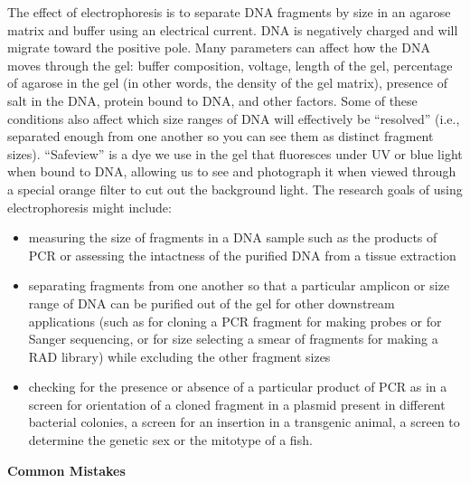 \documentclass[
  letterpaper,
  DIV=11,
  numbers=noendperiod]{scrreprt}
\begin{document}
The effect of electrophoresis is to separate DNA fragments by size in an
agarose matrix and buffer using an electrical current. DNA is negatively
charged and will migrate toward the positive pole. Many parameters can
affect how the DNA moves through the gel: buffer composition, voltage,
length of the gel, percentage of agarose in the gel (in other words, the
density of the gel matrix), presence of salt in the DNA, protein bound
to DNA, and other factors. Some of these conditions also affect which
size ranges of DNA will effectively be ``resolved'' (i.e., separated
enough from one another so you can see them as distinct fragment sizes).
``Safeview'' is a dye we use in the gel that fluoresces under UV or blue
light when bound to DNA, allowing us to see and photograph it when
viewed through a special orange filter to cut out the background light.
The research goals of using electrophoresis might include:

\begin{itemize}
\item
  measuring the size of fragments in a DNA sample such as the products
  of PCR or assessing the intactness of the purified DNA from a tissue
  extraction
\item
  separating fragments from one another so that a particular amplicon or
  size range of DNA can be purified out of the gel for other downstream
  applications (such as for cloning a PCR fragment for making probes or
  for Sanger sequencing, or for size selecting a smear of fragments for
  making a RAD library) while excluding the other fragment sizes
\item
  checking for the presence or absence of a particular product of PCR as
  in a screen for orientation of a cloned fragment in a plasmid present
  in different bacterial colonies, a screen for an insertion in a
  transgenic animal, a screen to determine the genetic sex or the
  mitotype of a fish.
\end{itemize}

\textbf{Common Mistakes}
\end{document}
